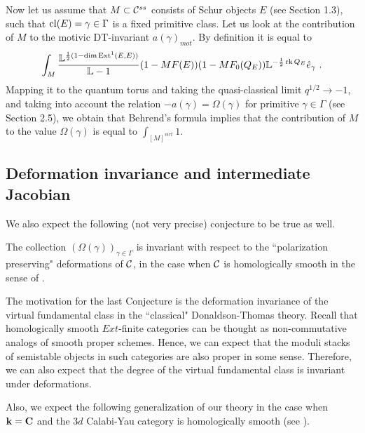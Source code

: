 \documentclass[12pt]{article}
\begin{document}
Now let us assume that $M\subset {\mathcal C}^{ss}$ consists of Schur objects $E$ (see Section 1.3), such that $\operatorname{cl}(E)=\gamma\in \Gamma$ is a fixed primitive class. Let us look at the contribution of $M$ to the motivic DT-invariant $a(\gamma)_{mot}$.
By definition it is equal to
$$\int_M{{\mathbb L}^{{1\over{2}}(1-\dim \operatorname{Ext}^1(E,E))}\over {\mathbb L}-1}(1-MF(E))(1-MF_0(Q_E)){\mathbb L}^{-{1\over{2}}\operatorname{rk}Q_E}\hat{e}_{\gamma}\,\,.$$
Mapping it to the quantum torus and taking the quasi-classical limit $q^{1/2}\to -1$, and taking into account
the relation $-a(\gamma)=\Omega(\gamma)$ for primitive $\gamma\in \Gamma$ (see Section 2.5), we obtain 
 that  Behrend's formula implies that the contribution of $M$ to the value 
$\Omega(\gamma)$ is equal to $\int_{[M]^{virt}}1$.






\subsection{Deformation invariance and intermediate Jacobian}

We also expect the following (not very precise) conjecture to be true as well.

\begin{conj}

 The collection $(\Omega(\gamma))_{\gamma \in \Gamma}$ is invariant with respect to the ``polarization preserving" deformations of ${\mathcal C}$, in the case when ${\mathcal C}$ is homologically smooth in the sense of \cite{KoSo3}.

\end{conj}

The motivation for the last Conjecture is the deformation invariance of the virtual fundamental class in the ``classical" Donaldson-Thomas theory.
Recall that  homologically smooth $Ext$-finite categories can be thought as non-commutative analogs of smooth proper schemes. Hence, we can expect that the moduli stacks of semistable objects in such categories are also proper in some
 sense. Therefore, we can also expect that the degree of the virtual fundamental class
  is invariant under deformations.

Also, we expect the following generalization of our theory in the case when ${\bf k}={\bf C}$ and the $3d$ Calabi-Yau category is homologically smooth (see \cite{KoSo3}).
\end{document}
